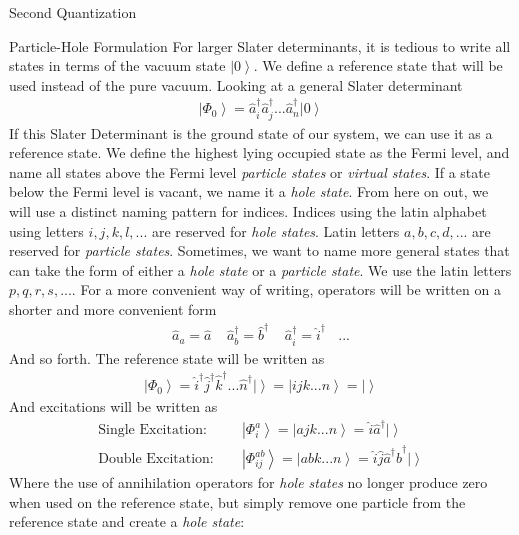 \documentclass[twoside,english]{uiofysmaster}
\begin{document}
\begin{chapter}{Second Quantization}
	\begin{section}{Particle-Hole Formulation}
		For larger Slater determinants, it is tedious to write all states in terms of the vacuum state $\left| 0 \right>$. We define a reference state that will be used instead of the pure vacuum. Looking at a general Slater determinant
		\begin{align}
			\left| \Phi_0 \right> = \hat a_i^\dagger \hat a_j^\dagger ... \hat a_n^\dagger \left| 0 \right>
		\end{align}
		If this Slater Determinant is the ground state of our system, we can use it as a reference state. We define the highest lying occupied state as the Fermi level, and name all states above the Fermi level \textit{particle states} or \textit{virtual states}. If a state below the Fermi level is vacant, we name it a \textit{hole state}. From here on out, we will use a distinct naming pattern for indices. Indices using the latin alphabet using letters $i, j, k, l, ...$ are reserved for \textit{hole states}. Latin letters $a, b, c, d, ...$ are reserved for \textit{particle states}. Sometimes, we want to name more general states that can take the form of either a \textit{hole state} or a \textit{particle state}. We use the latin letters $p, q, r, s, ...$. For a more convenient way of writing, operators will be written on a shorter and more convenient form
		\begin{align}
			\hat a_a = \hat a \:\:\:\:\: \hat a_b^\dagger = \hat b^\dagger \:\:\:\:\: \hat a_i^\dagger = \hat i^\dagger \:\:\:\: ...
		\end{align}
		And so forth. The reference state will be written as 
		\begin{align}
			\left| \Phi_0 \right> = \hat i^\dagger \hat j^\dagger \hat k^\dagger ... \hat n^\dagger \left| \right> = \left| ijk ... n \right> = \left| \right>
		\end{align}
		And excitations will be written as
		\begin{align}
			\text{Single Excitation: }\:\:\:\:& \left| \Phi_i^a \right> = \left| ajk ... n \right> = \hat i \hat a^\dagger \left| \right> \\
			\text{Double Excitation: }\:\:\:\:& \left| \Phi_{ij}^{ab} \right> = \left| abk ... n \right> = \hat i \hat j \hat a^\dagger \hat b^\dagger \left| \right> 
		\end{align}
		Where the use of annihilation operators for \textit{hole states} no longer produce zero when used on the reference state, but simply remove one particle from the reference state and create a \textit{hole state}:

\end{section}
\end{chapter}
\end{document}

